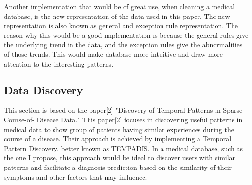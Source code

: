 \documentclass[sts]{sig-alternate}
\begin{document}
		Another implementation that would be of great use, when cleaning a medical database, is the 				new 	representation of the data used in this paper. The new representation is also known as 				general 	and exception rule representation. The reason why this would be a good implementation 			is because the general rules give the underlying trend in the data, and the exception rules 				give the abnormalities of those trends. This would make database more intuitive and draw 					more attention to the interesting patterns.

	\subsection{Data Discovery}
		\label{Data Discovery}
	
		This section is based on the paper[2] "Discovery of Temporal Patterns in Sparse Course-of-				Disease Data." This paper[2] focuses in discovering useful patterns in medical data to show 				group of patients having similar experiences during the course of a disease. Their approach is 			achieved by implementing a Temporal Pattern Discovery, better known as TEMPADIS. In a medical 			database, such as the one I propose, this approach would be ideal to discover users with similar 		patterns and facilitate a diagnosis prediction based on the similarity of their symptoms and 				other factors that may influence. \newline 
\end{document}

